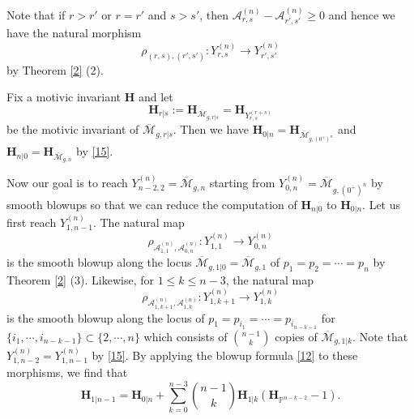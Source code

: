 \documentclass[11pt]{amsart}
\numberwithin{equation}{section}
\theoremstyle{definition}
\newcommand{\PP}{\mathbb{P}}
\newcommand{\bH}{\mathbf{H}}
\def\cA{{\mathcal A}}
\def\cM{{\mathcal M}}
\def\lra{\longrightarrow }
\def\beq{\begin{equation}}
\def\eeq{\end{equation}}
\def\bcM{\overline{\cM}}
\def\cAn{\cA^{(n)}}
\def\Yn{Y^{(n)}}
\begin{document}
Note that if $r>r'$ or $r=r'$ and $s>s'$, then $\cAn_{r,s}- \cAn_{r',s'}\ge 0$ and hence we have the natural morphism
$$\rho_{(r,s),(r',s')}:\Yn_{r,s}\lra \Yn_{r',s'}$$
by Theorem \ref{2} (2). 

Fix a motivic invariant $\bH$ and let 
\beq\label{14} \bH_{r|s}:=\bH_{\bcM_{g,r|s}}=\bH_{Y^{(r+s)}_{r,s}}\eeq 
be the motivic invariant %
of $\bcM_{g,r|s}$. 
Then we have $\bH_{0|n}=\bH_{\bcM_{g,(0^+)^n}}$ and $\bH_{n|0}=\bH_{\bcM_{g,n}}$ by \eqref{15}.

Now our goal is to reach $\Yn_{n-2,2}=\bcM_{g,n}$ starting from $\Yn_{0,n}=\bcM_{g,(0^+)^n}$ by smooth blowups so that we can reduce the computation of $\bH_{n|0}$ to $\bH_{0|n}$. Let us first reach $\Yn_{1,n-1}$. 
The natural map
$$\rho_{\cAn_{1,1},\cAn_{0,n}}:\Yn_{1,1}\lra \Yn_{0,n}$$
is the smooth blowup along the locus $\bcM_{g,1|0}=\bcM_{g,1}$ of $p_1=p_2=\cdots =p_n$ by Theorem \ref{2} (3). 
Likewise, for $1\le k\le n-3$, the natural map 
$$\rho_{\cAn_{1,k+1},\cAn_{1,k}}:\Yn_{1,k+1}\lra \Yn_{1,k}$$
is the smooth blowup along the locus of $p_1=p_{i_1}=\cdots=p_{i_{n-k-1}}$ for $\{i_1,\cdots,i_{n-k-1}\}\subset \{2,\cdots,n\}$ which consists of $\binom{n-1}{k}$ copies of $\bcM_{g,1|k}$.
Note that $\Yn_{1,n-2}=\Yn_{1,n-1}$ by \eqref{15}. 
By applying the blowup formula \eqref{12} to these morphisms, we find that 
\beq\label{13}
\bH_{1|n-1}=\bH_{0|n}+\sum_{k=0}^{n-3} \binom{n-1}{k} \bH_{1|k} (\bH_{\PP^{n-k-2}}-1).
\eeq
\end{document}
